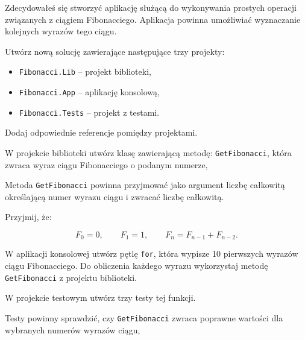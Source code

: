 \documentclass[11pt,a4paper,addpoints]{exam}
\begin{document}
\cellwidth{2.75cm}
\noindent \gradetable[h]

\vspace{0.8cm}

Zdecydowałeś się stworzyć aplikację służącą do wykonywania prostych operacji związanych z ciągiem Fibonacciego.
Aplikacja powinna umożliwiać wyznaczanie kolejnych wyrazów tego ciągu.

\begin{questions}

\question[5]
Utwórz nową solucję zawierające następujące trzy projekty:

\begin{itemize}
    \item \texttt{Fibonacci.Lib} -- projekt biblioteki,
    \item \texttt{Fibonacci.App} -- aplikację konsolową,
    \item \texttt{Fibonacci.Tests} -- projekt z testami.
\end{itemize}

Dodaj odpowiednie referencje pomiędzy projektami.

W projekcie biblioteki utwórz klasę zawierającą metodę:
\newline
\texttt{GetFibonacci}, która zwraca wyraz ciągu Fibonacciego o podanym numerze,


Metoda \texttt{GetFibonacci} powinna przyjmować jako argument liczbę całkowitą określającą numer wyrazu ciągu i zwracać liczbę całkowitą.

Przyjmij, że:

\[
F_0 = 0,\qquad F_1 = 1,\qquad
F_n = F_{n-1} + F_{n-2}.
\]


W aplikacji konsolowej utwórz pętlę \texttt{for}, która wypisze 10 pierwszych wyrazów ciągu Fibonacciego.
Do obliczenia każdego wyrazu wykorzystaj metodę \texttt{GetFibonacci} z projektu biblioteki.

W projekcie testowym utwórz trzy testy tej funkcji.

Testy powinny sprawdzić, czy \texttt{GetFibonacci} zwraca poprawne wartości dla wybranych numerów wyrazów ciągu,


\end{questions}
\end{document}
